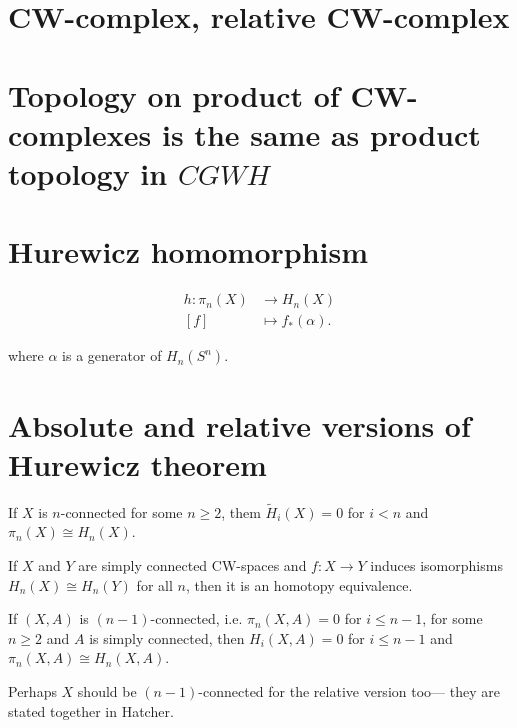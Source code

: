 \section{CW-complex, relative CW-complex}
\section{Topology on product of CW-complexes 
is the same as product topology in $CGWH$}

\section{Hurewicz homomorphism}
\label{section-Hurewicz-homomorphism}

\begin{definition}
\begin{align*}
h: \pi_{n}(X) &\longrightarrow H_{n}(X) \\
[f] &\longmapsto f_{*}(\alpha)
.\end{align*}
\end{definition}
where $\alpha$ is a generator of $ H_{n}(S^{n})$.

\section{Absolute and relative versions of Hurewicz theorem}
\label{section-absolute-and-relative-Hurewicz-theorem}

\begin{theorem}[Hurewicz]
\label{theorem-Hurewicz-absolute}
If $X$ is $n$-connected for some $n \geq 2$, them $\tilde{H}_i(X)=0$ for $i<n$
and $\pi_{n}(X)\cong H_n(X)$.
\end{theorem}

\begin{lemma}
\label{lemma-Hurewicz-homomorphism-gives-homotopy-equivalence}
If $X$ and $Y$ are simply connected CW-spaces and  $f:X \to Y$ induces
isomorphisms $H_n(X) \cong H_n(Y)$ for all $n$, then it is an homotopy
equivalence.
\end{lemma}

\begin{theorem}[Hurewicz]
\label{theorem-Hurewicz-relative}
If $(X,A)$ is $(n-1)$-connected, i.e. $\pi_{n}(X,A)=0$ for $i \leq n-1$, for 
some $n\geq 2$ and $A$ is simply connected, then $H_i(X,A)=0$ for $i\leq n-1$ 
and $\pi_{n}(X,A)\cong H_n(X,A)$.
\end{theorem}
Perhaps $X$ should be $(n-1)$-connected for the relative version too---
they are stated together in Hatcher.

